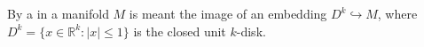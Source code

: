 By a  in a manifold $M$ is meant the image of an embedding $D^k \hookrightarrow M$, where $D^k = \{x \in \mathbb{R}^k : |x| \leqslant 1\}$ is the closed unit $k$-disk.
